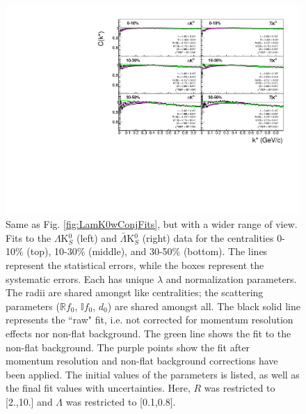 \documentclass[../AnalysisNoteJBuxton.tex]{subfiles}
\begin{document}
\begin{figure}[h]
  \centering
  \includegraphics[width=\textwidth]{7_ResultsAndDiscussion/Figures/canKStarCfwFitsLamK0wConj_0010_1030_3050UnZoomed_MomResCrctn_NonFlatBgdCrctn.pdf}
  \caption[$\Lambda$K$^{0}_{S}$($\bar{\Lambda}$K$^{0}_{S}$) Fits (Wide Range)]{Same as Fig. \ref{fig:LamK0wConjFits}, but with a wider range of view.  
Fits to the $\Lambda$K$^{0}_{S}$ (left) and $\bar{\Lambda}$K$^{0}_{S}$ (right) data for the centralities 0-10\% (top), 10-30\% (middle), and 30-50\% (bottom).
The lines represent the statistical errors, while the boxes represent the systematic errors.
Each has unique $\lambda$ and normalization parameters.
The radii are shared amongst like centralities; the scattering parameters ($\mathbb{R}f_{0}$, $\mathbb{I}f_{0}$, $d_{0}$) are shared amongst all.
The black solid line represents the ``raw" fit, i.e. not corrected for momentum resolution effects nor non-flat background.  
The green line shows the fit to the non-flat background.
The purple points show the fit after momentum resolution and non-flat background corrections have been applied.
The initial values of the parameters is listed, as well as the final fit values with uncertainties.
Here, $R$ was restricted to [2.,10.] and $\Lambda$ was restricted to [0.1,0.8].}
  \label{fig:LamK0wConjFitsUnZoomed}
\end{figure}
\end{document}
